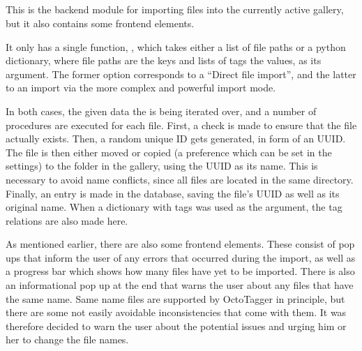 \subsection{}
\def\kapitelautor{Erik Ritschl}

This is the backend module for importing files into the currently active
gallery, but it also contains some frontend elements.

It only has a single function, , which takes either a
list of file paths or a python dictionary, where file paths are the keys and
lists of tags the values, as its argument. The former option corresponds to a
``Direct file import'', and the latter to an import via the more complex and
powerful import mode.

In both cases, the given data the is being iterated over, and a number of
procedures are executed for each file. First, a check is made to ensure that
the file actually exists. Then, a random unique ID gets generated, in form of
an UUID. The file is then either moved or copied (a preference
which can be set in the settings) to the  folder in the gallery,
using the UUID as its name. This is necessary to avoid name
conflicts, since all files are located in the same directory. Finally, an entry
is made in the database, saving the file's UUID as well as its
original name. When a dictionary with tags was used as the argument, the tag relations
are also made here.

As mentioned earlier, there are also some frontend elements. These consist of
pop ups that inform the user of any errors that occurred during the import, as
well as a progress bar which shows how many files have yet to be imported.
There is also an informational pop up at the end that warns the user about any
files that have the same name. Same name files are supported by OctoTagger in
principle, but there are some not easily avoidable inconsistencies that come
with them. It was therefore decided to warn the user about the potential issues
and urging him or her to change the file names.
